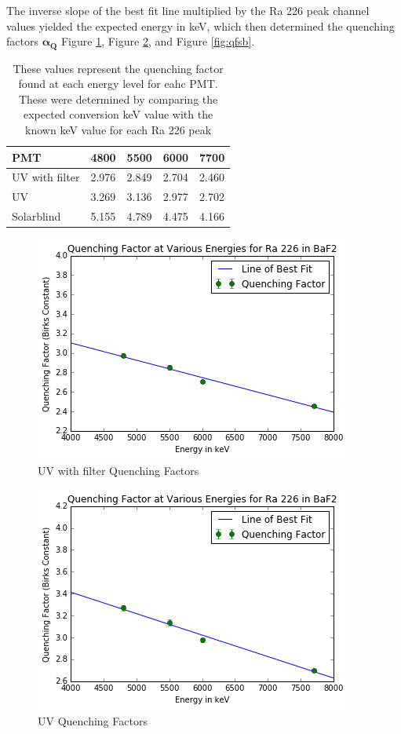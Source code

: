 The inverse slope of the best fit line multiplied by the Ra 226 peak channel values yielded the expected energy in keV, which then determined the quenching factors $\bm{\alpha_Q}$ Figure \ref{fig:qff}, Figure \ref{fig:qfuv}, and Figure \ref{fig:qfsb}.

\begin{table}
    \begin{tabular}{ | l | l | l | l | p{2cm} |}
    \hline
    PMT & 4800 & 5500 & 6000 & 7700\\ \hline

    UV with filter & 2.976 & 2.849 & 2.704 & 2.460\\ \hline  

    UV & 3.269 & 3.136 & 2.977 & 2.702\\ \hline

    Solarblind & 5.155 & 4.789 & 4.475 & 4.166\\ \hline
    \hline
    \end{tabular}
    \caption{These values represent the quenching factor found at each energy level for eahc PMT. These were determined by comparing the expected conversion keV value with the known keV value for each Ra 226 peak}
    \label{table:quench}
\end{table}

\begin{figure}
  \centering
    \includegraphics[width=.8\columnwidth]{qff.png}
  \caption{UV with filter Quenching Factors}
  \label{fig:qff}
\end{figure} 

\begin{figure}
  \centering
    \includegraphics[width=.8\columnwidth]{qfuv.png}
  \caption{UV Quenching Factors}
  \label{fig:qfuv}
\end{figure} 

